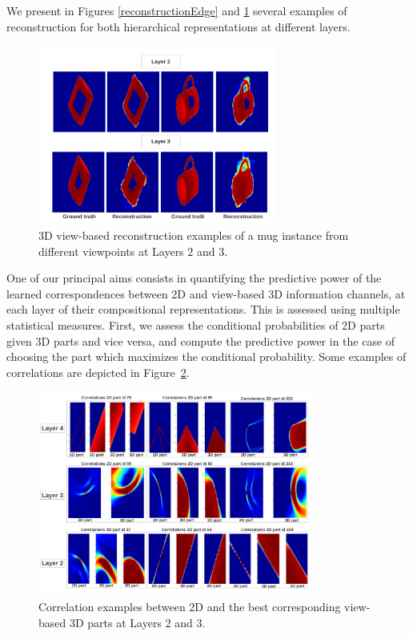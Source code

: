 \documentclass[runningheads]{llncs}
\begin{document}
We present in Figures \ref{reconstructionEdge} and \ref{reconstructionDepth} several examples of reconstruction for both hierarchical representations at different layers. 

\begin{figure}
\begin{center}
\includegraphics[width=0.7\textwidth]{reconstruction_depth}
\end{center}
\caption{3D view-based reconstruction examples of a mug instance from different viewpoints at Layers 2 and 3.}
\label{reconstructionDepth}
\end{figure}

One of our principal aims consists in quantifying the predictive power of the learned correspondences between 2D and view-based 3D information channels, at each layer of their compositional representations. This is assessed using multiple statistical measures. First, we assess the conditional probabilities of 2D parts given 3D parts and vice versa, and compute the predictive power in the case of choosing the part which maximizes the conditional probability. Some examples of correlations are depicted in Figure~\ref{correlations}.

\begin{figure}
\begin{center}
\includegraphics[width=0.8\textwidth]{correlations_1_3}
\end{center}
\caption{Correlation examples between 2D and the best corresponding view-based 3D parts at Layers 2 and 3.}
\label{correlations}
\end{figure}
\end{document}
